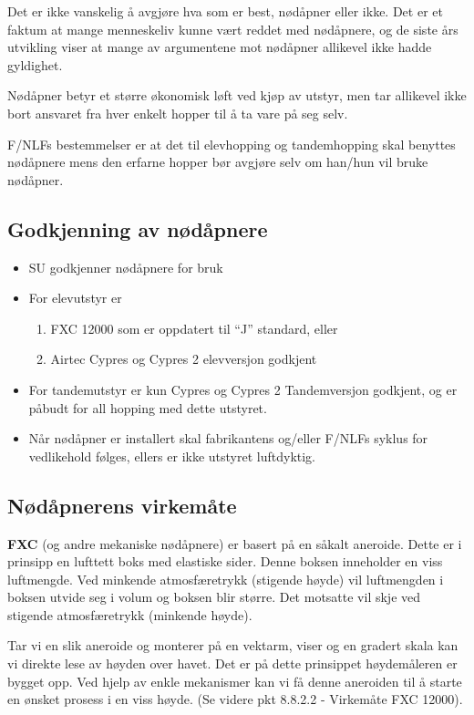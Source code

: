 Det er ikke vanskelig å avgjøre hva som er best, nødåpner eller ikke. Det er et faktum at mange menneskeliv kunne vært reddet med nødåpnere, og de siste års utvikling viser at mange av argumentene mot nødåpner allikevel ikke hadde gyldighet.

Nødåpner betyr et større økonomisk løft ved kjøp av utstyr, men tar allikevel ikke bort ansvaret fra hver enkelt hopper til å ta vare på seg selv.

F/NLFs bestemmelser er at det til elevhopping og tandemhopping skal benyttes nødåpnere mens den erfarne hopper bør avgjøre selv om han/hun vil bruke nødåpner.

\subsection{Godkjenning av nødåpnere}
\begin{itemize}
\item SU godkjenner nødåpnere for bruk
\item For elevutstyr er
\begin{enumerate}
\item FXC 12000 som er oppdatert til ``J'' standard, eller
\item Airtec Cypres og Cypres 2 elevversjon godkjent
\end{enumerate}

\item For tandemutstyr er kun Cypres og Cypres 2 Tandemversjon godkjent, og er påbudt for all hopping med dette utstyret.
\item Når nødåpner er installert skal fabrikantens og/eller F/NLFs syklus for vedlikehold følges, ellers er ikke utstyret luftdyktig.
\end{itemize}

\subsection{Nødåpnerens virkemåte}
\textbf{FXC} (og andre mekaniske nødåpnere) er basert på en såkalt aneroide. Dette er i prinsipp en lufttett boks med elastiske sider. Denne boksen inneholder en viss luftmengde. Ved minkende atmosfæretrykk (stigende høyde) vil luftmengden i boksen utvide seg i volum og boksen blir større. Det motsatte vil skje ved stigende atmosfæretrykk (minkende høyde).

Tar vi en slik aneroide og monterer på en vektarm, viser og en gradert skala kan vi direkte lese av høyden over havet. Det er på dette prinsippet høydemåleren er bygget opp. Ved hjelp av enkle mekanismer kan vi få denne aneroiden til å starte en ønsket prosess i en viss høyde. (Se videre pkt 8.8.2.2 - Virkemåte FXC 12000).

